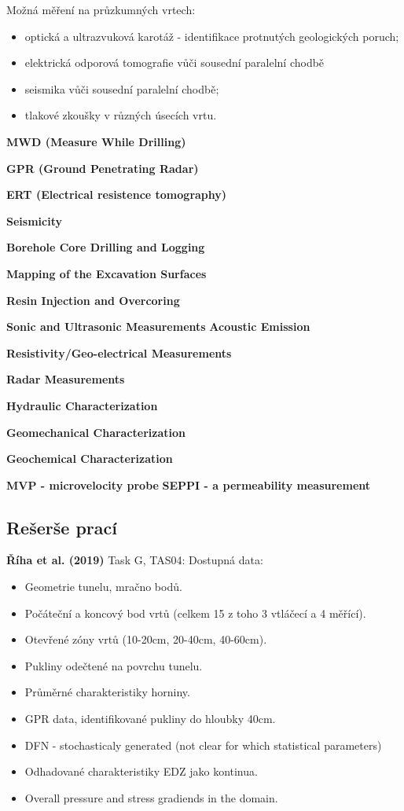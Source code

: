 \documentclass{article}
\begin{document}
Možná měření na průzkumných vrtech:
    \begin{itemize}
        \item optická a ultrazvuková karotáž - identifikace protnutých geologických poruch;
        \item elektrická odporová tomografie vůči sousední paralelní chodbě
        \item seismika vůči sousední paralelní chodbě;
        \item tlakové zkoušky v různých úsecích vrtu.
    \end{itemize}

{\bf MWD (Measure While Drilling)} \cite{JeroenvanEldert2018}

{\bf GPR (Ground Penetrating Radar)} 

{\bf ERT (Electrical resistence tomography)}


{\bf Seismicity}

{\bf  Borehole Core Drilling and Logging} \cite{Lanyon2011}

{\bf Mapping of the Excavation Surfaces} \cite{Lanyon2011}

{\bf  Resin Injection and Overcoring} \cite{Lanyon2011}

{\bf  Sonic and Ultrasonic Measurements} \cite{Lanyon2011}
{\bf  Acoustic Emission} \cite{Lanyon2011}

{\bf  Resistivity/Geo-electrical Measurements} \cite{Lanyon2011}

{\bf  Radar Measurements} \cite{Lanyon2011}

{\bf  Hydraulic Characterization} \cite{Lanyon2011}

{\bf  Geomechanical Characterization} \cite{Lanyon2011}

{\bf  Geochemical Characterization} \cite{Lanyon2011}

{\bf MVP - microvelocity probe} \cite{Rutqvist2009} 
{\bf SEPPI - a permeability measurement} \cite{Rutqvist2009} 


\subsection{Rešerše prací}

{\bf Říha et al. (2019)} Task G, TAS04: Dostupná data: 
\begin{itemize}
    \item Geometrie tunelu, mračno bodů.
    \item Počáteční a koncový bod vrtů (celkem 15 z toho 3 vtláčecí a 4 měřící).
    \item Otevřené zóny vrtů (10-20cm, 20-40cm, 40-60cm).
    \item Pukliny odečtené na povrchu tunelu.
    \item Průměrné charakteristiky horniny.
    \item GPR data, identifikované pukliny do hloubky 40cm.
    \item DFN - stochasticaly generated (not clear for which statistical parameters)
    \item Odhadované charakteristiky EDZ jako kontinua.
    \item Overall pressure and stress gradiends in the domain.
\end{itemize}
\end{document}
